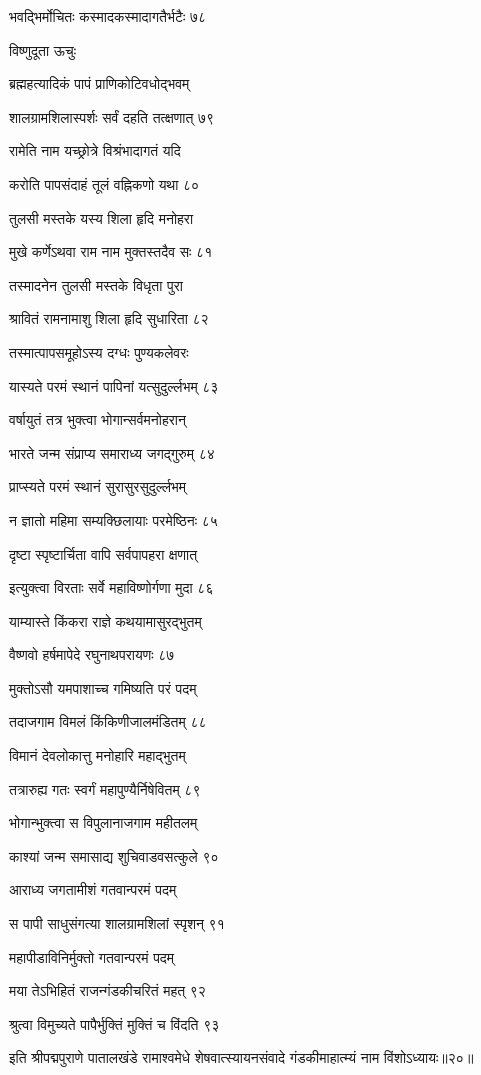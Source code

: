 भवद्भिर्मोचितः कस्मादकस्मादागतैर्भटैः ७८

विष्णुदूता ऊचुः

ब्रह्महत्यादिकं पापं प्राणिकोटिवधोद्भवम्

शालग्रामशिलास्पर्शः सर्वं दहति तत्क्षणात् ७९

रामेति नाम यच्छ्रोत्रे विश्रंभादागतं यदि

करोति पापसंदाहं तूलं वह्निकणो यथा ८०

तुलसी मस्तके यस्य शिला हृदि मनोहरा

मुखे कर्णेऽथवा राम नाम मुक्तस्तदैव सः ८१

तस्मादनेन तुलसी मस्तके विधृता पुरा

श्रावितं रामनामाशु शिला हृदि सुधारिता ८२

तस्मात्पापसमूहोऽस्य दग्धः पुण्यकलेवरः

यास्यते परमं स्थानं पापिनां यत्सुदुर्ल्लभम् ८३

वर्षायुतं तत्र भुक्त्वा भोगान्सर्वमनोहरान्

भारते जन्म संप्राप्य समाराध्य जगद्गुरुम् ८४

प्राप्स्यते परमं स्थानं सुरासुरसुदुर्ल्लभम्

न ज्ञातो महिमा सम्यक्छिलायाः परमेष्ठिनः ८५

दृष्टा स्पृष्टार्चिता वापि सर्वपापहरा क्षणात्

इत्युक्त्वा विरताः सर्वे महाविष्णोर्गणा मुदा ८६

याम्यास्ते किंकरा राज्ञे कथयामासुरद्भुतम्

वैष्णवो हर्षमापेदे रघुनाथपरायणः ८७

मुक्तोऽसौ यमपाशाच्च गमिष्यति परं पदम्

तदाजगाम विमलं किंकिणीजालमंडितम् ८८

विमानं देवलोकात्तु मनोहारि महाद्भुतम्

तत्रारुह्य गतः स्वर्गं महापुण्यैर्निषेवितम् ८९

भोगान्भुक्त्वा स विपुलानाजगाम महीतलम्

काश्यां जन्म समासाद्य शुचिवाडवसत्कुले ९०

आराध्य जगतामीशं गतवान्परमं पदम्

स पापी साधुसंगत्या शालग्रामशिलां स्पृशन् ९१

महापीडाविनिर्मुक्तो गतवान्परमं पदम्

मया तेऽभिहितं राजन्गंडकीचरितं महत् ९२

श्रुत्वा विमुच्यते पापैर्भुक्तिं मुक्तिं च विंदति ९३

इति श्रीपद्मपुराणे पातालखंडे रामाश्वमेधे शेषवात्स्यायनसंवादे गंडकीमाहात्म्यं नाम विंशोऽध्यायः॥२०॥

